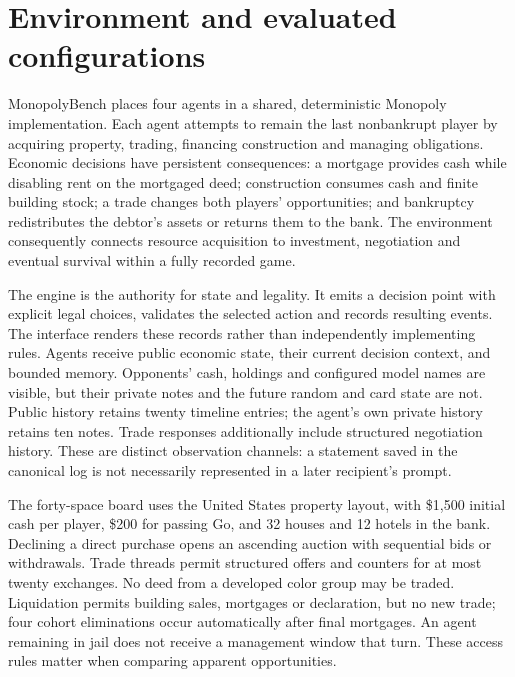 \section{Environment and evaluated configurations}
\label{sec:setup}

MonopolyBench places four agents in a shared, deterministic Monopoly implementation. Each agent attempts to remain the last nonbankrupt player by acquiring property, trading, financing construction and managing obligations. Economic decisions have persistent consequences: a mortgage provides cash while disabling rent on the mortgaged deed; construction consumes cash and finite building stock; a trade changes both players' opportunities; and bankruptcy redistributes the debtor's assets or returns them to the bank. The environment consequently connects resource acquisition to investment, negotiation and eventual survival within a fully recorded game.

The engine is the authority for state and legality. It emits a decision point with explicit legal choices, validates the selected action and records resulting events. The interface renders these records rather than independently implementing rules. Agents receive public economic state, their current decision context, and bounded memory. Opponents' cash, holdings and configured model names are visible, but their private notes and the future random and card state are not. Public history retains twenty timeline entries; the agent's own private history retains ten notes. Trade responses additionally include structured negotiation history. These are distinct observation channels: a statement saved in the canonical log is not necessarily represented in a later recipient's prompt.

The forty-space board uses the United States property layout, with \$1,500 initial cash per player, \$200 for passing Go, and 32 houses and 12 hotels in the bank. Declining a direct purchase opens an ascending auction with sequential bids or withdrawals. Trade threads permit structured offers and counters for at most twenty exchanges. No deed from a developed color group may be traded. Liquidation permits building sales, mortgages or declaration, but no new trade; four cohort eliminations occur automatically after final mortgages. An agent remaining in jail does not receive a management window that turn. These access rules matter when comparing apparent opportunities.

